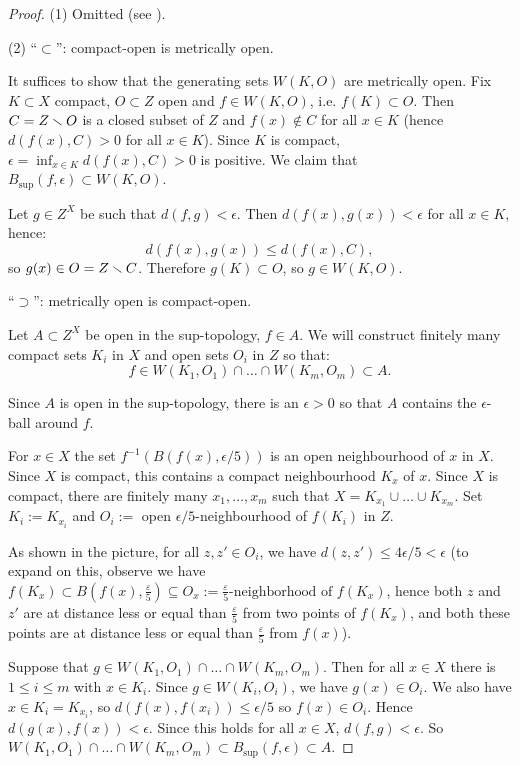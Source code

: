 \begin{proof}
(1) Omitted (see \cite[Proposition A.13]{hatcher}).

(2) \enquote{$\subset$}: compact-open is metrically open.

It suffices to show that the generating sets $W(K,O)$ are metrically open. Fix $K\subset X$ compact, $O\subset Z$ open and $f\in W(K,O)$, i.e. $f(K)\subset O$. Then $C=Z\smallsetminus O$ is a closed subset of $Z$ and $f(x)\not\in C$ for all $x\in K$ (hence $d(f(x),C)>0$ for all $x\in K$). Since $K$ is compact, $\epsilon=\inf_{x\in K}d(f(x),C)>0$
is positive.
We claim that $B_{\sup}(f,\epsilon)\subset W(K,O)$.

Let $g\in Z^X$ be such that $d(f,g)<\epsilon$. Then $d(f(x),g(x))<\epsilon$ for all $x\in K$, hence:
\[d(f(x),g(x))\leq d(f(x),C),\]
so $g(x)\in O=Z\smallsetminus C$. Therefore $g(K)\subset O$, so $g\in W(K,O)$.

\enquote{$\supset$}: metrically open is compact-open.

Let $A\subset Z^X$ be open in the sup-topology, $f\in A$. We will construct finitely many compact sets $K_i$ in $X$ and open sets $O_i$ in $Z$ so that:
\[f\in W(K_1,O_1)\cap\dots\cap W(K_m,O_m)\subset A.\]

Since $A$ is open in the sup-topology, there is an $\epsilon>0$ so that $A$ contains the $\epsilon$-ball around $f$.

For $x\in X$ the set $f^{-1}(B(f(x),\epsilon/5))$ is an open neighbourhood of $x$ in $X$. Since $X$ is compact, this contains a compact neighbourhood $K_x$ of $x$. Since $X$ is compact, there are finitely many $x_1,\dots,x_m$ such that $X=K_{x_1}\cup\dots\cup K_{x_m}$.
Set $K_i:=K_{x_i}$ and $O_i:=$ open $\epsilon/5$-neighbourhood of $f(K_i)$ in $Z$.


As shown in the picture, for all $z,z'\in O_i$, we have $d(z,z')\leq 4\epsilon/5<\epsilon$ (to expand on this, observe we have $f(K_x) \subset B(f(x),\frac{\varepsilon}{5})\subseteq O_x := \frac{\varepsilon}{5}\text{-neighborhood of }f(K_x)$, hence both $z$ and $z'$ are at distance less or equal than $\frac{\varepsilon}{5}$ from two points of $f(K_x)$, and both these points are at distance less or equal than $\frac{\varepsilon}{5}$ from $f(x)$).

Suppose that $g\in W(K_1,O_1)\cap\dots\cap W(K_m,O_m)$. Then for all $x\in X$ there is $1\leq i\leq m$ with $x\in K_i$. Since $g\in W(K_i,O_i)$, we have $g(x)\in O_i$. We also have $x\in K_i=K_{x_i}$, so $d(f(x),f(x_i))\leq\epsilon/5$ so $f(x)\in O_i$. Hence $d(g(x),f(x))<\epsilon$. Since this holds for all $x\in X$, $d(f,g)<\epsilon$. So $W(K_1,O_1)\cap\dots\cap W(K_m,O_m)\subset B_{\sup}(f,\epsilon)\subset A$.
\end{proof}
